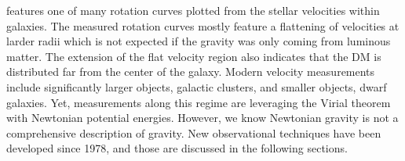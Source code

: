 \begin{figure}[t]
\end{figure}

 features one of many rotation curves plotted from the stellar velocities within galaxies.
The measured rotation curves mostly feature a flattening of velocities at larder radii which is not expected if the gravity was only coming from luminous matter.
The extension of the flat velocity region also indicates that the DM is distributed far from the center of the galaxy.
Modern velocity measurements include significantly larger objects, galactic clusters, and smaller objects, dwarf galaxies.
Yet, measurements along this regime are leveraging the Virial theorem with Newtonian potential energies.
However, we know Newtonian gravity is not a comprehensive description of gravity.
New observational techniques have been developed since 1978, and those are discussed in the following sections.

